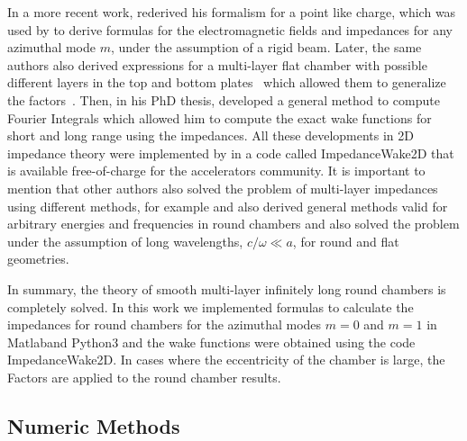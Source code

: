     In a more recent work,  rederived his formalism for a point like charge, which was used by  to derive formulas for the electromagnetic fields and impedances for any azimuthal mode $m$, under the assumption of a rigid beam. Later, the same authors also derived expressions for a multi-layer flat chamber with possible different layers in the top and bottom plates~\cite{Mounet2010a} which allowed them to generalize the \citeauthor{Yokoya1993} factors~\cite{Mounet2010}. Then, in his PhD thesis,  developed a general method to compute Fourier Integrals which allowed him to compute the exact wake functions for short and long range using the impedances. All these developments in 2D impedance theory were implemented by \citeauthor{Mounet2011} in a code called ImpedanceWake2D that is available free-of-charge for the accelerators community. It is important to mention that other authors also solved the problem of multi-layer impedances using different methods, for example  and  also derived general methods valid for arbitrary energies and frequencies in round chambers and  also solved the problem under the assumption of long wavelengths, $c/\omega \ll a$, for round and flat geometries.

    In summary, the theory of smooth multi-layer infinitely long round chambers is completely solved. In this work we implemented \citeauthor{Mounet2009} formulas to calculate the impedances for round chambers for the azimuthal modes $m=0$ and $m=1$ in Matlab\textregistered and Python3 and the wake functions were obtained using the code ImpedanceWake2D. In cases where the eccentricity of the chamber is large, the \citeauthor{Yokoya1993} Factors are applied to the round chamber results.

\subsection{Numeric Methods}\label{ssec:numeric_methods}

